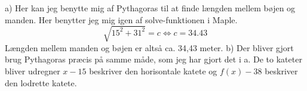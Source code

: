 a) Her kan jeg benytte mig af Pythagoras til at finde længden mellem bøjen og manden. Her benytter jeg mig igen af solve-funktionen i Maple.
$$\sqrt{15^2+31^2}=c\Longleftrightarrow c=34.43$$
Længden mellem manden og bøjen er altså ca. 34,43 meter.\newline\newline
b) Der bliver gjort brug Pythagoras præcis på samme måde, som jeg har gjort det i a. De to kateter bliver udregner $x-15$ beskriver den horisontale katete og $f(x)-38$ beskriver den lodrette katete.